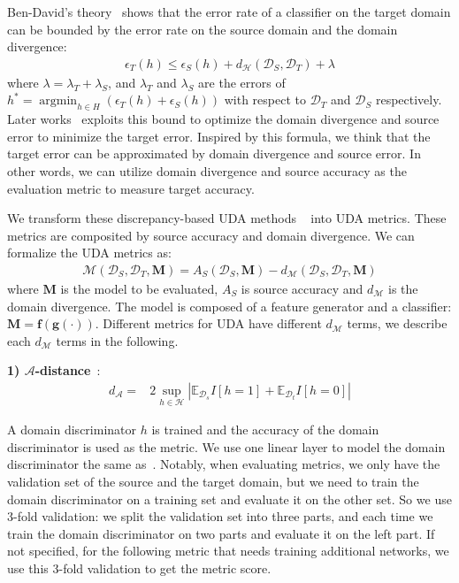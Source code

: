 Ben-David's theory~\cite{BenDavidA,BenDavidH} shows that the error rate of a classifier on the target domain can be bounded by the error rate on the source domain and the domain divergence:
\begin{align}
    \epsilon_T(h) \leq \epsilon_S(h)+d_{\mathcal{H}}\left(\mathcal{D}_S, \mathcal{D}_T\right)+\lambda
\end{align}
where $\lambda=\lambda_T+\lambda_S$, and $\lambda_T$ and $\lambda_S$ are the errors of $h^*=\operatorname{argmin}_{h \in H}\left(\epsilon_T(h)+\epsilon_S(h)\right)$ with respect
to $\mathcal{D}_T$ and $\mathcal{D}_S$ respectively. Later works~\cite{DANN} exploits this bound to optimize the domain divergence and source error to minimize the target error. Inspired by this formula, we think that the target error can be approximated by domain divergence and source error. In other words, we can utilize domain divergence and source accuracy as the evaluation metric to measure target accuracy.

We transform these discrepancy-based UDA methods ~\cite{BenDavidA,BenDavidH,MCD,MDD} into UDA metrics. These metrics are composited by source accuracy and domain divergence. We can formalize the UDA metrics as:
\begin{align}
    \mathcal{M}(\mathcal{D}_S, \mathcal{D}_T, \boldsymbol{M}) = 
    A_S(\mathcal{D}_S, \boldsymbol{M}) - d_{\mathcal{M}}(\mathcal{D}_S, \mathcal{D}_T, \boldsymbol{M})
\end{align}
where $\boldsymbol{M}$ is the model to be evaluated, $ A_S$ is source accuracy and $d_{\mathcal{M}}$ is the domain divergence. The model is composed of a feature generator and a classifier: $\boldsymbol{M}=\textbf{f}(\textbf{g}(\cdot))$.
Different metrics for UDA have different $d_{\mathcal{M}}$ terms, we describe each $d_{\mathcal{M}}$ terms in the following.

\textbf{1) $\mathcal{A}$-distance}~\cite{BenDavidA}:
\begin{align}
    d_{\mathcal{A}}=&2\sup_{h \in \mathcal{H}}|\mathbb{E}_{\mathcal{D}_s} I\left[h=1\right]+\mathbb{E}_{\mathcal{D}_t} I\left[h=0\right]|\nonumber
\end{align}

A domain discriminator $h$ is trained and the accuracy of the domain discriminator is used as the metric. We use one linear layer to model the domain discriminator the same as~\cite{tllib}.
Notably, when evaluating metrics, we only have the validation set of the source and the target domain, but we need to train the domain discriminator on a training set and evaluate it on the other set. So we use 3-fold validation: we split the validation set into three parts, and each time we train the domain discriminator on two parts and evaluate it on the left part. If not specified, for the following metric that needs training additional networks, we use this 3-fold validation to get the metric score.

